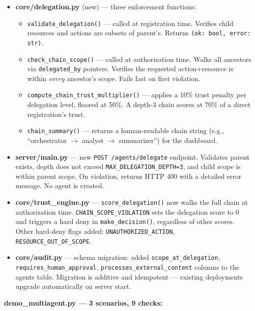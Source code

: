 \documentclass[12pt, a4paper]{article}
\begin{document}
\begin{itemize}[noitemsep]
  \item \textbf{core/delegation.py} (new) — three enforcement functions:
    \begin{itemize}[noitemsep]
      \item \texttt{validate\_delegation()} — called at registration time.
        Verifies child resources and actions are subsets of parent's.
        Returns \texttt{(ok: bool, error: str)}.
      \item \texttt{check\_chain\_scope()} — called at authorization time.
        Walks all ancestors via \texttt{delegated\_by} pointers.
        Verifies the requested action+resource is within \textit{every}
        ancestor's scope. Fails fast on first violation.
      \item \texttt{compute\_chain\_trust\_multiplier()} — applies a 10\% trust
        penalty per delegation level, floored at 50\%.
        A depth-3 chain scores at 70\% of a direct registration's trust.
      \item \texttt{chain\_summary()} — returns a human-readable chain string
        (e.g., ``orchestrator $\to$ analyst $\to$ summarizer'') for the dashboard.
    \end{itemize}
  \item \textbf{server/main.py} — new \texttt{POST /agents/delegate} endpoint.
    Validates parent exists, depth does not exceed \texttt{MAX\_DELEGATION\_DEPTH=3},
    and child scope is within parent scope. On violation, returns HTTP 400
    with a detailed error message. No agent is created.
  \item \textbf{core/trust\_engine.py} — \texttt{score\_delegation()} now
    walks the full chain at authorization time. \texttt{CHAIN\_SCOPE\_VIOLATION}
    sets the delegation score to 0 and triggers a hard deny in
    \texttt{make\_decision()}, regardless of other scores.
    Other hard-deny flags added: \texttt{UNAUTHORIZED\_ACTION},
    \texttt{RESOURCE\_OUT\_OF\_SCOPE}.
  \item \textbf{core/audit.py} — schema migration: added
    \texttt{scope\_at\_delegation}, \texttt{requires\_human\_approval},
    \texttt{processes\_external\_content} columns to the agents table.
    Migration is additive and idempotent — existing deployments upgrade
    automatically on server start.
\end{itemize}

\textbf{demo\_multiagent.py — 3 scenarios, 9 checks:}
\end{document}
